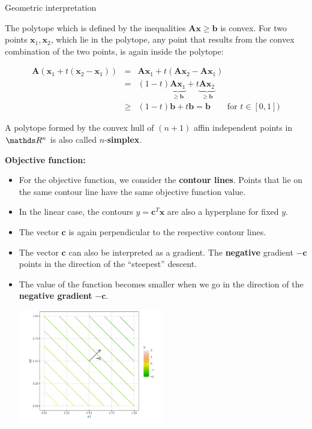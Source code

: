 \begin{vbframe}{Geometric interpretation}
\lz

The polytope which is defined by the inequalities $\bm{Ax} \ge \bm{b}$ is convex. For two points $\bm{x}_1, \bm{x}_2$, which lie in the polytope, any point that results from the convex combination of the two points, is again inside the polytope:

\begin{eqnarray*}
\bm{A}(\bm{x}_1 + t(\bm{x}_2 - \bm{x}_1)) &=& \bm{A}\bm{x}_1 + t(\bm{A}\bm{x}_2 - \bm{A}\bm{x}_1) \\ &=& (1 -t)\underbrace{\bm{A}\bm{x}_1}_{\ge \bm{b}} + t\underbrace{\bm{A}\bm{x}_2}_{\ge \bm{b}} \\ &\ge& (1 - t) \bm{b} + t \bm{b} = \bm{b} \qquad \text{for }t \in [0, 1])
\end{eqnarray*}

A polytope formed by the convex hull of $(n + 1)$ affin independent points in $\R^n$ is also called $n$-\textbf{simplex}.

\framebreak

\textbf{Objective function:}
\begin{itemize}
\item For the objective function, we consider the \textbf{contour lines}. Points that lie on the same contour line have the same objective function value.
\item In the linear case, the contours $y = \bm{c}^T \bm{x}$ are also a hyperplane for fixed $y$.
\item The vector $\bm{c}$ is again perpendicular to the respective contour lines.
\item The vector $\bm{c}$ can also be interpreted as a gradient. The \textbf{negative} gradient $- \bm{c}$ points in the direction of the \enquote{steepest} descent.
\framebreak
\item The value of the function becomes smaller when we go in the direction of the \textbf{negative gradient} $- \bm{c}$.

\begin{center}
\includegraphics[width = 0.5\textwidth]{figure_man/negative-gradient.png}
\end{center}



\end{itemize}
\end{vbframe}
